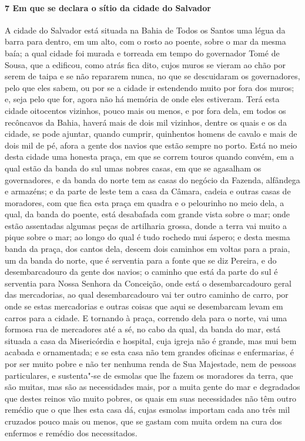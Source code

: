 \begin{linenumbers}
\paragraph{7 Em que se declara o sítio da cidade do Salvador} \quad
A cidade do Salvador está situada na Bahia de Todos os Santos uma légua da barra para
dentro, em um alto, com o rosto ao poente, sobre o mar da mesma baía; a qual cidade foi
murada e torreada em tempo do governador Tomé de Sousa, que a edificou, como atrás fica
dito, cujos muros se vieram ao chão por serem de taipa e se não repararem nunca, no que se
descuidaram os governadores, pelo que eles sabem, ou por se a cidade ir estendendo muito
por fora dos muros; e, seja pelo que for, agora não há memória de onde eles estiveram.
Terá esta cidade oitocentos vizinhos, pouco mais ou menos, e por fora dela, em todos os
recôncavos da Bahia, haverá mais de dois mil vizinhos, dentre os quais e os da cidade, se
pode ajuntar, quando cumprir, quinhentos homens de cavalo e mais de dois mil de pé, afora
a gente dos navios que estão sempre no porto. Está no meio desta cidade uma honesta praça,
em que se correm touros quando convém, em a qual estão da banda do sul umas nobres casas,
em que se agasalham os governadores, e da banda do norte tem as casas do negócio da
Fazenda, alfândega e armazéns; e da parte de leste tem a casa da Câmara, cadeia e outras
casas de moradores, com que fica esta praça em quadra e o pelourinho no meio dela, a qual,
da banda do poente, está desabafada com grande vista sobre o mar; onde estão assentadas
algumas peças de artilharia grossa, donde a terra vai muito a pique sobre o mar; ao longo
do qual é tudo rochedo mui áspero; e desta mesma banda da praça, dos cantos dela, descem
dois caminhos em voltas para a praia, um da banda do norte, que é serventia para a fonte
que se diz Pereira, e do desembarcadouro da gente dos navios; o caminho que está da parte
do sul é serventia para Nossa Senhora da Conceição, onde está o desembarcadouro geral das
mercadorias, ao qual desembarcadouro vai ter outro caminho de carro, por onde se estas
mercadorias e outras coisas que aqui se desembarcam levam em carros para a cidade. E
tornando à praça, correndo dela para o norte, vai uma formosa rua de mercadores até a sé,
no cabo da qual, da banda do mar, está situada a casa da Misericórdia e hospital, cuja
igreja não é grande, mas mui bem acabada e ornamentada; e se esta casa não tem grandes
oficinas e enfermarias, é por ser muito pobre e não ter nenhuma renda de Sua Majestade,
nem de pessoas particulares, e sustenta"-se de esmolas que lhe fazem os moradores da terra,
que são muitas, mas são as necessidades mais, por a muita gente do mar e degradados que
destes reinos vão muito pobres, os quais em suas necessidades não têm outro remédio que o
que lhes esta casa dá, cujas esmolas importam cada ano três mil cruzados pouco mais ou
menos, que se gastam com muita ordem na cura dos enfermos e remédio dos necessitados.


\end{linenumbers}
